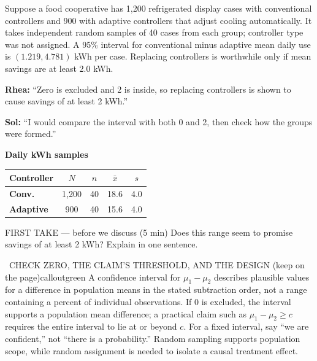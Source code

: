 \documentclass[11pt]{article}
\begin{document}


Suppose a food cooperative has 1{,}200 refrigerated display cases with conventional controllers and 900 with adaptive controllers that adjust cooling automatically. It takes independent random samples of 40 cases from each group; controller type was not assigned. A 95\% interval for conventional minus adaptive mean daily use is $(1.219,4.781)$ kWh per case. Replacing controllers is worthwhile only if mean savings are at least 2.0 kWh.\par\smallskip \textbf{Rhea:} ``Zero is excluded and 2 is inside, so replacing controllers is shown to cause savings of at least 2 kWh.''\par \textbf{Sol:} ``I would compare the interval with both 0 and 2, then check how the groups were formed.''\par
\begin{center}
\textbf{Daily kWh samples}\par\smallskip
\begin{tabular}{|l|c|c|c|c|}
\hline
\textbf{Controller} & \textbf{$N$} & \textbf{$n$} & \textbf{$\bar x$} & \textbf{$s$} \\ \hline
\textbf{Conv.} & 1,200 & 40 & 18.6 & 4.0 \\ \hline
\textbf{Adaptive} & 900 & 40 & 15.6 & 4.0 \\ \hline
\end{tabular}
\end{center}
\begin{firsttakebox}{FIRST TAKE --- before we discuss (5 min)}
Does this range seem to promise savings of at least 2 kWh? Explain in one sentence.
\workspace{0.9in}
\end{firsttakebox}

\begin{callout}{\IconBook\ CHECK ZERO, THE CLAIM'S THRESHOLD, AND THE DESIGN (keep on the page)}{calloutgreen}
A confidence interval for $\mu_1-\mu_2$ describes plausible values for a difference in
population means in the stated subtraction order, not a range containing a percent of individual
observations. If 0 is excluded, the interval supports a population mean difference; a practical
claim such as $\mu_1-\mu_2\geq c$ requires the entire interval to lie at or beyond $c$.
For a fixed interval, say ``we are confident,'' not ``there is a probability.'' Random sampling
supports population scope, while random assignment is needed to isolate a causal treatment effect.
\end{callout}
\end{document}
